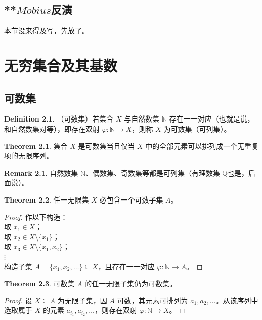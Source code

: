 \documentclass[oneside]{book}
\theoremstyle{definition}
\newtheorem{definition}{Definition}[section]
\newtheorem{theorem}{Theorem}[section]
\newtheorem{remark}{Remark}[section]
\begin{document}
\section{**\(M\ddot{o}bius\)反演}
本节没来得及写，先放了。
\chapter{无穷集合及其基数}
\section{可数集}

\begin{definition}
	（可数集）若集合 \( X \) 与自然数集 \( \mathbb{N} \) 存在一一对应（也就是说，和自然数集对等），即存在双射 \( \varphi: \mathbb{N} \to X \)，则称 \( X \) 为可数集（可列集）。
\end{definition}

\begin{theorem}
	集合 \( X \) 是可数集当且仅当 \( X \) 中的全部元素可以排列成一个无重复项的无限序列。
\end{theorem}

\begin{remark}
	自然数集 \( \mathbb{N} \)、偶数集、奇数集等都是可列集（有理数集 \(\mathbb{Q}\)也是，后面说）。
\end{remark}


\begin{theorem}
	任一无限集 \( X \) 必包含一个可数子集 \( A \)。
\end{theorem}

\begin{proof}
	作以下构造：\\
	取 \( x_1 \in X \)；\\
	取 \( x_2 \in X \setminus \{ x_1 \} \)；\\
	取 \( x_3 \in X \setminus \{ x_1, x_2 \} \)；\\
	\(\vdots\)\\
	构造子集 \( A = \{ x_1, x_2, \dots \} \subseteq X \)，且存在一一对应 \( \varphi: \mathbb{N} \to A \)。
\end{proof}

\begin{theorem}
	可数集 \( A \) 的任一无限子集仍为可数集。
\end{theorem}

\begin{proof}
	设 \( X \subseteq A \) 为无限子集，因 \( A \) 可数，其元素可排列为 \( a_1, a_2, \dots \)。从该序列中选取属于 \( X \) 的元素 \( a_{i_1}, a_{i_2}, \dots \)，则存在双射 \( \varphi: \mathbb{N} \to X \)。
\end{proof}
\end{document}
